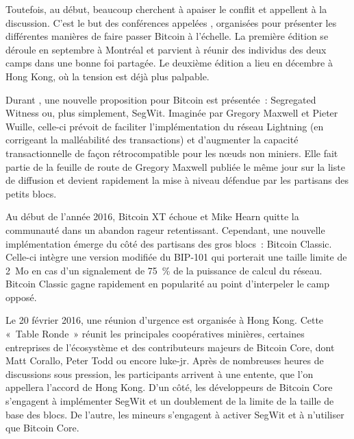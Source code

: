 Toutefois, au début, beaucoup cherchent à apaiser le conflit et appellent à la discussion. C'est le but des conférences appelées , organisées pour présenter les différentes manières de faire passer Bitcoin à l'échelle. La première édition se déroule en septembre à Montréal et parvient à réunir des individus des deux camps dans une bonne foi partagée. Le deuxième édition a lieu en décembre à Hong Kong, où la tension est déjà plus palpable.

Durant , une nouvelle proposition pour Bitcoin est présentée~: Segregated Witness ou, plus simplement, SegWit. Imaginée par Gregory Maxwell et Pieter Wuille, celle-ci prévoit de faciliter l'implémentation du réseau Lightning (en corrigeant la malléabilité des transactions) et d'augmenter la capacité transactionnelle de façon rétrocompatible pour les nœuds non miniers. Elle fait partie de la feuille de route de Gregory Maxwell publiée le même jour sur la liste de diffusion et devient rapidement la mise à niveau défendue par les partisans des petits blocs.

Au début de l'année 2016, Bitcoin XT échoue et Mike Hearn quitte la communauté dans un abandon rageur retentissant. Cependant, une nouvelle implémentation émerge du côté des partisans des gros blocs~: Bitcoin Classic. Celle-ci intègre une version modifiée du BIP-101 qui porterait une taille limite de 2~Mo en cas d'un signalement de 75~\% de la puissance de calcul du réseau. Bitcoin Classic gagne rapidement en popularité au point d'interpeler le camp opposé.

Le 20 février 2016, une réunion d'urgence est organisée à Hong Kong. Cette «~Table Ronde~» réunit les principales coopératives minières, certaines entreprises de l'écosystème et des contributeurs majeurs de Bitcoin Core, dont Matt Corallo, Peter Todd ou encore luke-jr. Après de nombreuses heures de discussions sous pression, les participants arrivent à une entente, que l'on appellera l'accord de Hong Kong. D'un côté, les développeurs de Bitcoin Core s'engagent à implémenter SegWit et un doublement de la limite de la taille de base des blocs. De l'autre, les mineurs s'engagent à activer SegWit et à n'utiliser que Bitcoin Core.

